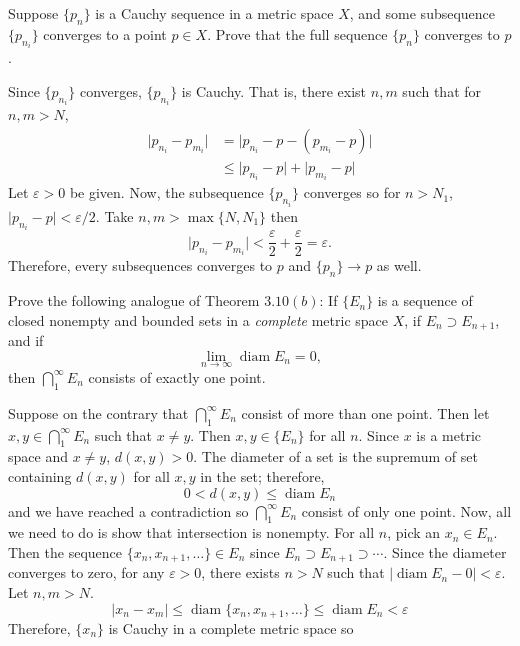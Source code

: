 \begin{exercise}
  Suppose \(\{p_n\}\) is a Cauchy sequence in a metric space \(X\), and some
  subsequence \(\{p_{n_i}\}\) converges to a point \(p\in X\).
  Prove that the full sequence \(\{p_n\}\) converges to \(p\).
  \par\smallskip
  Since \(\{p_{n_i}\}\) converges, \(\{p_{n_i}\}\) is Cauchy.
  That is, there exist \(n,m\) such that for \(n,m > N\),
  \begin{align*}
    \lvert p_{n_i} - p_{m_i}\rvert
    & = \lvert p_{n_i} - p - (p_{m_i} - p)\rvert\\
    & \leq \lvert p_{n_i} - p\rvert + \lvert p_{m_i} - p\rvert
  \end{align*}
  Let \(\varepsilon > 0\) be given.
  Now, the subsequence \(\{p_{n_i}\}\) converges so for \(n > N_1\),
  \(\lvert p_{n_i} - p\rvert < \varepsilon/2\).
  Take \(n,m > \max\{N, N_1\}\) then
  \[
  \lvert p_{n_i} - p_{m_i}\rvert < \frac{\varepsilon}{2} + \frac{\varepsilon}{2}
  = \varepsilon.
  \]
  Therefore, every subsequences converges to \(p\) and \(\{p_n\}\to p\) as
  well.
\item
  \label{3.21}
  Prove the following analogue of Theorem \(3.10(b)\): If \(\{E_n\}\) is a
  sequence of closed nonempty and bounded sets in a \textit{complete} metric
  space \(X\), if \(E_n\supset E_{n + 1}\), and if
  \[
  \lim_{n\to\infty}\operatorname{diam} E_n = 0,
  \]
  then \(\bigcap_1^{\infty}E_n\) consists of exactly one point.
  \par\smallskip
  Suppose on the contrary that \(\bigcap_1^{\infty}E_n\) consist of more than
  one point.
  Then let \(x,y\in\bigcap_1^{\infty}E_n\) such that \(x\neq y\).
  Then \(x,y\in\{E_n\}\) for all \(n\).
  Since \(x\) is a metric space and \(x\neq y\), \(d(x,y) > 0\).
  The diameter of a set is the supremum of set containing \(d(x,y)\) for all
  \(x,y\) in the set; therefore,
  \[
  0 < d(x,y)\leq\operatorname{diam} E_n
  \]
  and we have reached a contradiction so \(\bigcap_1^{\infty}E_n\) consist of
  only one point.
  Now, all we need to do is show that intersection is nonempty.
  For all \(n\), pick an \(x_n\in E_n\).
  Then the sequence \(\{x_n,x_{n + 1},\ldots\}\in E_n\) since
  \(E_n\supset E_{n + 1}\supset\cdots\).
  Since the diameter converges to zero, for any \(\varepsilon > 0\), there exists
  \(n > N\) such that \(\lvert\operatorname{diam}E_n - 0\rvert < \varepsilon\).
  Let \(n,m > N\).
  \[
  \lvert x_n - x_m\rvert\leq\operatorname{diam}\{x_n, x_{n + 1},\ldots\}\leq
  \operatorname{diam}E_n < \varepsilon
  \]
  Therefore, \(\{x_n\}\) is Cauchy in a complete metric space so

\end{exercise}
